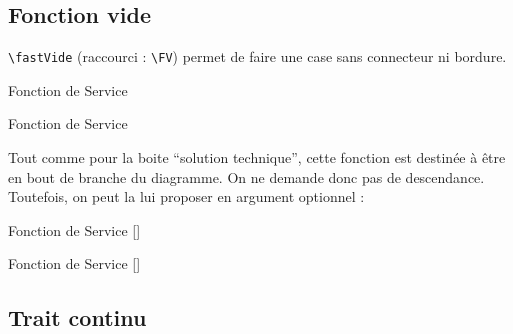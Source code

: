 	\subsection{Fonction vide}\label{fvide}

		{\color{blue}\verb'\fastVide'} (raccourci : {\color{blue}\verb'\FV'}) permet de faire une case sans connecteur ni bordure.

\begin{code}
\begin{fast}{Fonction de Service}
		{
		}
\end{fast}
\end{code}
		\cqd
\begin{exemple}
\begin{fast}{Fonction de Service}
		{
		}
\end{fast}
\end{exemple}

		Tout comme pour la boite ``solution technique'', cette fonction est destinée à être en bout de branche du diagramme.
		On ne demande donc pas de descendance.
		Toutefois, on peut la lui proposer en argument optionnel :

\begin{code}
\begin{fast}{Fonction de Service}
	[]
\end{fast}
\end{code}
\cqd
\begin{exemple}
\begin{fast}{Fonction de Service}
	[]
\end{fast}
\end{exemple}


	\subsection{Trait continu}\label{trait}

